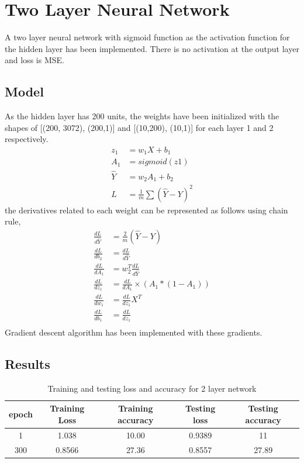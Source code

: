 \documentclass[a4paper, 12pt]{article}
\begin{document}
	
	\section{Two Layer Neural Network}
		A two layer neural network with sigmoid function as the activation function for the hidden layer has been implemented. There is no activation at the output layer and loss is MSE. 
		\subsection{Model}
			As the hidden layer has 200 units, the weights have been initialized with the shapes of [(200, 3072), (200,1)] and [(10,200), (10,1)] for each layer 1 and 2 respectively.
			\begin{align*}
				z_1 & = w_1X + b_1\\
				A_1 &= sigmoid(z1) \\
				\hat{Y} & = w_2A_1 + b_2 \\
				L &= \frac{1}{m}\sum{(\hat{Y}-Y)^2}  
			\end{align*}
		the derivatives related to each weight can be represented as follows using chain rule,
			\begin{align*}
				\frac{dL}{d\hat{Y}} &= \frac{2}{m}(\hat{Y} - Y) \\
				\frac{dL}{db_2} &= \frac{dL}{d\hat{Y}}\\
				\frac{dL}{dA_1} &= w_2^T\frac{dL}{d\hat{Y}}\\
				\frac{dL}{dz_1} &= \frac{dL}{dA_1} \times (A_1 * (1-A_1))\\
				\frac{dL}{dw_1} &= \frac{dL}{dz_1}X^T\\
				\frac{dL}{db_1} &= \frac{dL}{dz_1}\\
			\end{align*}
		Gradient descent algorithm has been implemented with these gradients.
		\subsection{Results}
		
		\begin{table}
			\centering
			\begin{tabular}{|c|c|c|c|c|}
				\hline
				epoch & Training Loss & Training accuracy & Testing loss & Testing accuracy\\
				\hline
				1 & 1.038 & 10.00 & 0.9389& 11 \\
				300 & 0.8566 & 27.36 & 0.8557 & 27.89\\
				\hline
			\end{tabular}
			\label{nn2}
			\caption{Training and testing loss and accuracy for 2 layer network}
		\end{table}
	
\end{document}
